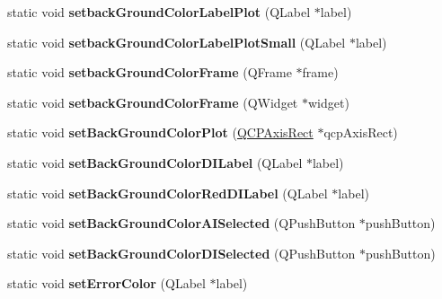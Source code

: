 \begin{DoxyCompactItemize}
static void {\bfseries setback\+Ground\+Color\+Label\+Plot} (Q\+Label $\ast$label)
\item 
\mbox{\label{class_common_style_ab9d6e9a05542c7677995b2b48eaf99c2}} 
static void {\bfseries setback\+Ground\+Color\+Label\+Plot\+Small} (Q\+Label $\ast$label)
\item 
\mbox{\label{class_common_style_a5d211b09123f4e72effb26015eca0ee8}} 
static void {\bfseries setback\+Ground\+Color\+Frame} (Q\+Frame $\ast$frame)
\item 
\mbox{\label{class_common_style_ab0c5ac4c0890d8d4eecf8dc51b656ebf}} 
static void {\bfseries setback\+Ground\+Color\+Frame} (Q\+Widget $\ast$widget)
\item 
\mbox{\label{class_common_style_af66490dcfcba25b0042fb08f91e463a5}} 
static void {\bfseries set\+Back\+Ground\+Color\+Plot} (\hyperlink{class_q_c_p_axis_rect}{Q\+C\+P\+Axis\+Rect} $\ast$qcp\+Axis\+Rect)
\item 
\mbox{\label{class_common_style_a4fa008632d9c9d545957491142f9f27d}} 
static void {\bfseries set\+Back\+Ground\+Color\+D\+I\+Label} (Q\+Label $\ast$label)
\item 
\mbox{\label{class_common_style_a1f7fbfdcaef79f6091d9819cbf0b68aa}} 
static void {\bfseries set\+Back\+Ground\+Color\+Red\+D\+I\+Label} (Q\+Label $\ast$label)
\item 
\mbox{\label{class_common_style_a7af86c89b26dfb5e3a78525e9c17661d}} 
static void {\bfseries set\+Back\+Ground\+Color\+A\+I\+Selected} (Q\+Push\+Button $\ast$push\+Button)
\item 
\mbox{\label{class_common_style_a75ef34f5f30b29a7d8b29b79d540351b}} 
static void {\bfseries set\+Back\+Ground\+Color\+D\+I\+Selected} (Q\+Push\+Button $\ast$push\+Button)
\item 
\mbox{\label{class_common_style_a03aa771414beddbe8b56e59a42de57ac}} 
static void {\bfseries set\+Error\+Color} (Q\+Label $\ast$label)
\item 
\mbox{\label{class_common_style_ac7e900375aefe63a2bdd6cc195902977}} 

\end{DoxyCompactItemize}

